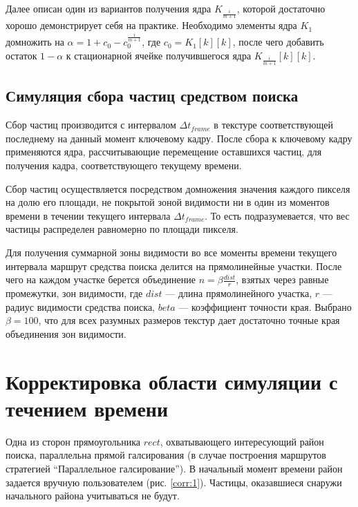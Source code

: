 Далее описан один из вариантов получения ядра $K_{\frac {i} {m + 1}}$, которой достаточно
хорошо демонстрирует себя на практике. Необходимо элементы ядра $K_{1}$ домножить на
$\alpha = 1 + c_0 - c_0^{\frac {i} {m+1}}$, где $c_0 = K_{1}[k][k]$, после чего добавить 
остаток $1 - \alpha$ к стационарной ячейке получившегося ядра $K_{\frac {i} {m + 1}}[k][k]$.
\FloatBarrier
\subsection{Симуляция сбора частиц средством поиска}
Сбор частиц производится с интервалом $\Delta t_{frame}$ в текстуре соответствующей последнему
на данный момент ключевому кадру. После сбора к ключевому кадру применяются ядра,
рассчитывающие перемещение оставшихся частиц, для получения кадра, соответствующего
текущему времени.

Сбор частиц осуществляется посредством домножения значения каждого пикселя на долю его площади,
не покрытой зоной видимости ни в один из моментов времени в течении текущего интервала
$\Delta t_{frame}$. То есть подразумевается, что вес частицы распределен равномерно по площади
пикселя.

 Для получения суммарной зоны видимости во все моменты времени текущего интервала маршрут
средства поиска делится на прямолинейные участки. После чего на каждом участке берется объединение
$n = \beta \frac{dist}{r}$, взятых через равные промежутки, зон видимости, где $dist$ --- длина
прямолинейного участка, $r$ --- радиус видимости средства поиска, $beta$ --- коэффициент
точности края. Выбрано $\beta = 100$, что для всех разумных размеров текстур дает достаточно точные
края объединения зон видимости.

\FloatBarrier
\section{Корректировка области симуляции с течением времени}
\begin{figure}[ht]
  \centering
\begin{minipage}[t]{.48\textwidth}
  \centering
  \label{corr:1}
\end{minipage}
\begin{minipage}[t]{.48\textwidth}
  \centering
  \label{corr:2}
\end{minipage}
\end{figure}
Одна из сторон прямоугольника $rect$, охватывающего интересующий район поиска, параллельна прямой
галсирования (в случае построения маршрутов стратегией ``Параллельное галсирование''). 
В начальный момент времени район задается вручную пользователем (рис. \ref{corr:1}).
Частицы, оказавшиеся снаружи начального района учитываться не будут.

